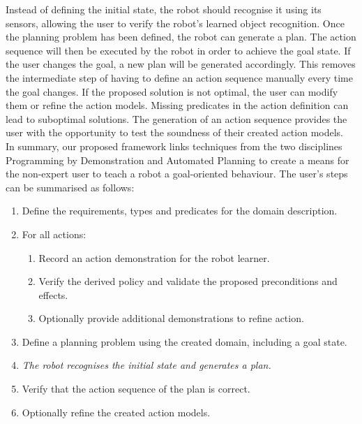 Instead of defining the initial state, the robot should recognise it using its sensors, allowing the user to verify the robot's learned object recognition. Once the planning problem has been defined, the robot can generate a plan. The action sequence will then be executed by the robot in order to achieve the goal state. If the user changes the goal, a new plan will be generated accordingly.
This removes the intermediate step of having to define an action sequence manually every time the goal changes. 
If the proposed solution is not optimal, the user can modify them or refine the action models. Missing predicates in the action definition can lead to suboptimal solutions. The generation of an action sequence provides the user with the opportunity to test the soundness of their created action models.\\

\noindent In summary, our proposed framework links techniques from the two disciplines Programming by Demonstration and Automated Planning to create a means for the non-expert user to teach a robot a goal-oriented behaviour. The user's steps can be summarised as follows:

\begin{enumerate}
\item Define the requirements, types and predicates for the domain description.
\item For all actions:
\begin{enumerate}
\item Record an action demonstration for the robot learner.
\item Verify the derived policy and validate the proposed preconditions and effects.
\item Optionally provide additional demonstrations to refine action.
\end{enumerate}
\item Define a planning problem using the created domain, including a goal state.
\item \textit{The robot recognises the initial state and generates a plan.}
\item Verify that the action sequence of the plan is correct.
\item Optionally refine the created action models.
\end{enumerate}